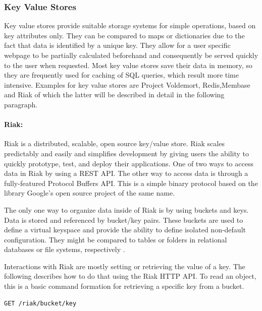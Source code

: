 \subsubsection{Key Value Stores}

Key value stores provide suitable storage systems for simple operations, based on key attributes only. They can be compared to maps or dictionaries due to the fact that data is identified by a unique key. They allow for a user specific webpage to be partially calculated beforehand and consequently be served quickly to the user when requested. Most key value stores save their data in memory, so they are frequently used for caching of SQL queries, which result more time intensive. Examples for key value stores are Project Voldemort, Redis,Membase and Riak of which the latter will be described in detail in the following paragraph.

\paragraph{Riak:} Riak is a distributed, scalable, open source key/value store. Riak scales predictably and easily and simplifies development by giving users the ability to quickly prototype, test, and deploy their applications. One of two ways to access data in Riak by using a REST API. The other way to access data is through a fully-featured Protocol Buffers API. This is a simple binary protocol based on the library Google's open source project of the same name.

The only one way to organize data inside of Riak is by using buckets and keys. Data is stored and referenced by bucket/key pairs. These buckets are used to define a virtual keyspace and provide the ability to define isolated non-default configuration. They might be compared to tables or folders in relational databases or file systems, respectively \cite{Riak:Buckets}.

Interactions with Riak are mostly setting or retrieving the value of a key. The following describes how to do that using the Riak HTTP API. To read an object, this is a basic command formation for retrieving a specific key from a bucket. 

\begin{code}
\begin{verbatim}
GET /riak/bucket/key
\end{verbatim}
\label{lst:riak_get}
\end{code}

